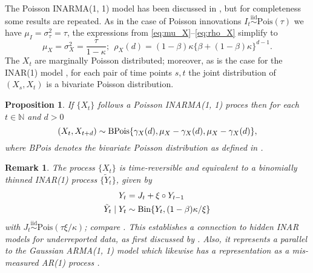 \documentclass{article}
\newtheorem{proposition}{Proposition}
\newtheorem{remark}{Remark}
\begin{document}
The Poisson INARMA(1, 1) model has been discussed in \cite{Bracher2019}, but for completeness some results are repeated. As in the case of Poisson innovations $I_t \stackrel{\text{iid}}{\sim} \text{Pois}(\tau)$ we have $\mu_I = \sigma^2_\tau = \tau$, the expressions from \eqref{eq:mu_X}--\eqref{eq:rho_X} simplify to 
\begin{equation}
\mu_X = \sigma^2_X = \frac{\tau}{1 - \kappa}; \ \ \rho_X(d) = (1 - \beta)\kappa\{\beta + (1 - \beta)\kappa\}^{d - 1}.\label{eq:moments_poisson_11}
\end{equation}
The $X_t$ are marginally Poisson distributed; moreover, as is the case for the INAR(1) model \cite{Weiss2018a}, for each pair of time points $s, t$ the joint distribution of $(X_s, X_t)$ is a bivariate Poisson distribution.
\begin{proposition}
If $\{X_t\}$ follows a Poisson INARMA(1, 1) proces then for each $t \in \mathbb{N}$ and $d >0$
\begin{equation}
(X_t, X_{t + d}) \sim \textnormal{BPois}\{\gamma_X(d), \mu_X - \gamma_X(d), \mu_X - \gamma_X(d)\},\label{eq:bivariate_poisson}
\end{equation}
where BPois denotes the bivariate Poisson distribution as defined in \cite{Johnson1997}.
\end{proposition}

\begin{remark}
The process $\{X_t\}$ is time-reversible and equivalent to a binomially thinned INAR(1) process $\{\tilde{Y}_t\}$, given by
\begin{align}
Y_t & = J_t + \xi \circ Y_{t - 1} \label{eq:equiv_INAR1_Y}\\
\tilde{Y}_t \mid Y_t & \sim \textnormal{Bin}\{Y_t, (1 - \beta)\kappa/\xi\}\label{eq:equiv_INAR1_Ytilde}
\end{align}
with $J_t \stackrel{\text{iid}}{\sim} \text{Pois}(\tau\xi/\kappa)$; compare \citep{Bracher2019}. This establishes a connection to hidden INAR models for underreported data, as first discussed by \cite{Fernandez-Fontelo2016}. Also, it represents a parallel to the Gaussian ARMA(1, 1) model which likewise has a representation as a mis-measured AR(1) process \citep[Lemma 1]{Staudenmayer2005}.
\end{remark}
\end{document}
